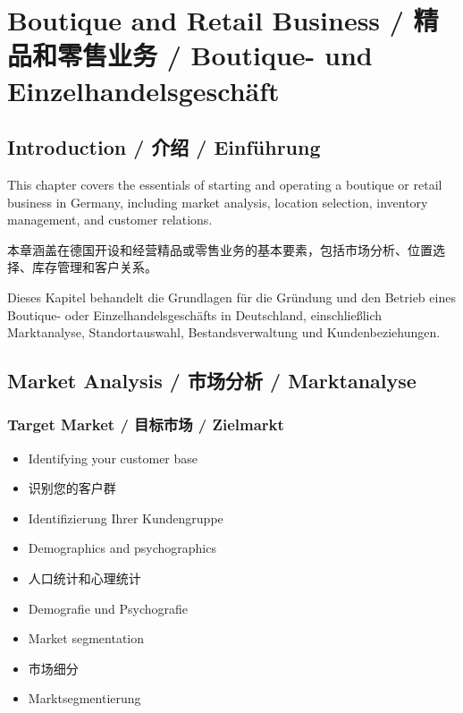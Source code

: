 \chapter{Boutique and Retail Business / 精品和零售业务 / Boutique- und Einzelhandelsgeschäft}

\section{Introduction / 介绍 / Einführung}

This chapter covers the essentials of starting and operating a boutique or retail business in Germany, including market analysis, location selection, inventory management, and customer relations.

本章涵盖在德国开设和经营精品或零售业务的基本要素，包括市场分析、位置选择、库存管理和客户关系。

Dieses Kapitel behandelt die Grundlagen für die Gründung und den Betrieb eines Boutique- oder Einzelhandelsgeschäfts in Deutschland, einschließlich Marktanalyse, Standortauswahl, Bestandsverwaltung und Kundenbeziehungen.

\section{Market Analysis / 市场分析 / Marktanalyse}

\subsection{Target Market / 目标市场 / Zielmarkt}
\begin{itemize}
    \item Identifying your customer base
    \item 识别您的客户群
    \item Identifizierung Ihrer Kundengruppe
    \item Demographics and psychographics
    \item 人口统计和心理统计
    \item Demografie und Psychografie
    \item Market segmentation
    \item 市场细分
    \item Marktsegmentierung
\end{itemize}

